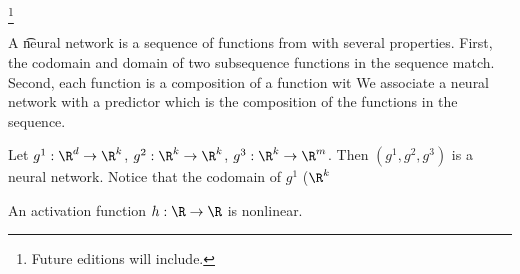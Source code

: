 
\footnote{Future editions will include.}


A \t{neural network} is a sequence of functions from  with several properties.
First, the codomain and domain of two subsequence functions in the sequence match.
Second, each function is a composition of a function wit
We associate a neural network with a predictor which is the composition of the functions in the sequence.


Let $g^1: \R^d \to \R^k$, $g^2: \R^k \to \R^k$, $g^3: \R^k \to \R^m$.
Then $(g^1, g^2, g^3)$ is a neural network.
Notice that the codomain of $g^1$ ($\R^k$


An activation function $h: \R \to \R$ is nonlinear.

\blankpage
